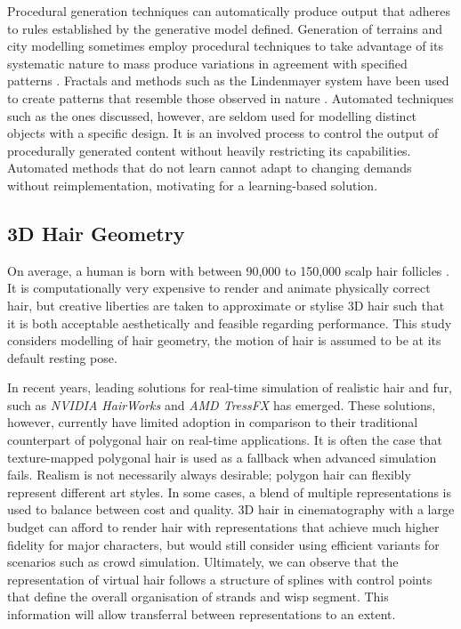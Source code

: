 \documentclass[ %
author={Dillon Keith Diep},
supervisor={Dr. Carl Henrik Ek},
degree={MEng},
title={ART-CG Hair:},
subtitle={Assisted Real-time Content Generation of Stylised Virtual Hair},
type={Research},
year={2017} ]{dissertation}
\begin{document}
Procedural generation techniques can automatically produce output that adheres to rules established by the generative model defined. Generation of terrains and city modelling sometimes employ procedural techniques to take advantage of its systematic nature to mass produce variations in agreement with specified patterns \cite{procedural1}. Fractals and methods such as the Lindenmayer system have been used to create patterns that resemble those observed in nature \cite{lsystem}. Automated techniques such as the ones discussed, however, are seldom used for modelling distinct objects with a specific design. It is an involved process to control the output of procedurally generated content without heavily restricting its capabilities. Automated methods that do not learn cannot adapt to changing demands without reimplementation, motivating for a learning-based solution.

\subsection{3D Hair Geometry}
On average, a human is born with between 90,000 to 150,000 scalp hair follicles \cite{hairfollicles}. It is computationally very expensive to render and animate physically correct hair, but creative liberties are taken to approximate or stylise 3D hair such that it is both acceptable aesthetically and feasible regarding performance. This study considers modelling of hair geometry, the motion of hair is assumed to be at its default resting pose.

In recent years, leading solutions for real-time simulation of realistic hair and fur, such as \textit{NVIDIA HairWorks} and \textit{AMD TressFX} has emerged. These solutions, however, currently have limited adoption in comparison to their traditional counterpart of polygonal hair on real-time applications. It is often the case that texture-mapped polygonal hair is used as a fallback when advanced simulation fails. Realism is not necessarily always desirable; polygon hair can flexibly represent different art styles. In some cases, a blend of multiple representations is used to balance between cost and quality. 3D hair in cinematography with a large budget can afford to render hair with representations that achieve much higher fidelity for major characters, but would still consider using efficient variants for scenarios such as crowd simulation. Ultimately, we can observe that the representation of virtual hair follows a structure of splines with control points that define the overall organisation of strands and wisp segment. This information will allow transferral between representations to an extent.
\end{document}

